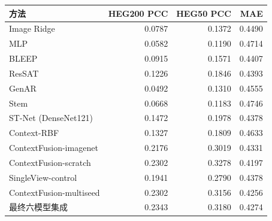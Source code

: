 \begin{tabular}{lrrr}
\toprule
方法 & HEG200 PCC & HEG50 PCC & MAE \\
\midrule
Image Ridge & 0.0787 & 0.1372 & 0.4490 \\
MLP & 0.0582 & 0.1190 & 0.4714 \\
BLEEP & 0.0915 & 0.1571 & 0.4407 \\
ResSAT & 0.1226 & 0.1846 & 0.4393 \\
GenAR & 0.0492 & 0.1310 & 0.4555 \\
Stem & 0.0668 & 0.1183 & 0.4746 \\
ST-Net (DenseNet121) & 0.1472 & 0.1978 & 0.4378 \\
Context-RBF & 0.1327 & 0.1809 & 0.4633 \\
ContextFusion-imagenet & 0.2176 & 0.3019 & 0.4331 \\
ContextFusion-scratch & 0.2302 & 0.3278 & 0.4197 \\
SingleView-control & 0.1941 & 0.2790 & 0.4378 \\
ContextFusion-multiseed & 0.2302 & 0.3156 & 0.4256 \\
最终六模型集成 & 0.2343 & 0.3180 & 0.4274 \\
\bottomrule
\end{tabular}
